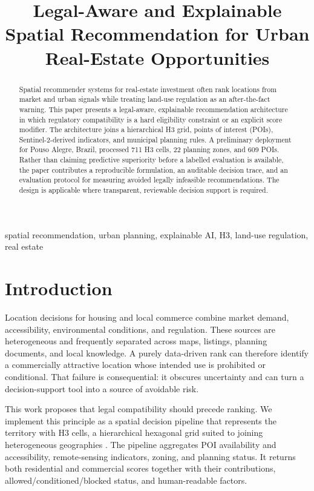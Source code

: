 \documentclass[conference]{IEEEtran}
\title{Legal-Aware and Explainable Spatial Recommendation for Urban Real-Estate Opportunities}
\author{\IEEEauthorblockN{Alvaro Careli}\IEEEauthorblockA{Independent Researcher\\Brazil}}
\begin{document}
\maketitle
\begin{abstract}
Spatial recommender systems for real-estate investment often rank locations from market and urban signals while treating land-use regulation as an after-the-fact warning. This paper presents a legal-aware, explainable recommendation architecture in which regulatory compatibility is a hard eligibility constraint or an explicit score modifier. The architecture joins a hierarchical H3 grid, points of interest (POIs), Sentinel-2-derived indicators, and municipal planning rules. A preliminary deployment for Pouso Alegre, Brazil, processed 711 H3 cells, 22 planning zones, and 609 POIs. Rather than claiming predictive superiority before a labelled evaluation is available, the paper contributes a reproducible formulation, an auditable decision trace, and an evaluation protocol for measuring avoided legally infeasible recommendations. The design is applicable where transparent, reviewable decision support is required.
\end{abstract}
\begin{IEEEkeywords}spatial recommendation, urban planning, explainable AI, H3, land-use regulation, real estate\end{IEEEkeywords}

\section{Introduction}
Location decisions for housing and local commerce combine market demand, accessibility, environmental conditions, and regulation. These sources are heterogeneous and frequently separated across maps, listings, planning documents, and local knowledge. A purely data-driven rank can therefore identify a commercially attractive location whose intended use is prohibited or conditional. That failure is consequential: it obscures uncertainty and can turn a decision-support tool into a source of avoidable risk.

This work proposes that legal compatibility should precede ranking. We implement this principle as a spatial decision pipeline that represents the territory with H3 cells, a hierarchical hexagonal grid suited to joining heterogeneous geographies \cite{h3}. The pipeline aggregates POI availability and accessibility, remote-sensing indicators, zoning, and planning status. It returns both residential and commercial scores together with their contributions, allowed/conditioned/blocked status, and human-readable factors.
\end{document}
